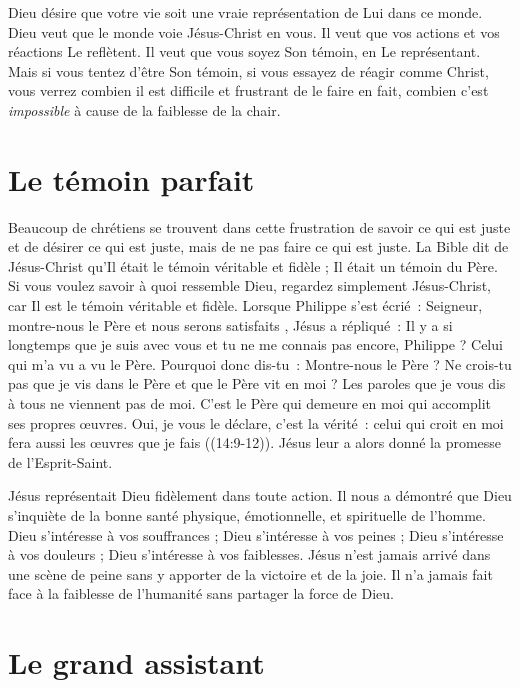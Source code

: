 Dieu désire que votre vie soit une vraie représentation de Lui dans ce monde.
 Dieu veut que le monde voie Jésus-Christ en vous.
 Il veut que vos actions et vos réactions Le reflètent.
 Il veut que vous soyez Son témoin, en Le représentant.
 Mais si vous tentez d'être Son témoin, si vous essayez de réagir comme Christ,
 vous verrez combien il est difficile et frustrant de le faire
 \ocadr en fait, combien c'est \emph{impossible}
 à cause de la faiblesse de la chair.

\section{Le t\'emoin parfait}

Beaucoup de chrétiens se trouvent dans cette frustration de savoir
 ce qui est juste et de désirer ce qui est juste, mais de ne pas faire
 ce qui est juste.
 La Bible dit de Jésus-Christ qu'Il était le témoin véritable et fidèle ;
 Il était un témoin du Père.
 Si vous voulez savoir à quoi ressemble Dieu, regardez simplement
 Jésus-Christ, car Il est le témoin véritable et fidèle.
 Lorsque Philippe s'est écrié~:
 \og Seigneur, montre-nous le Père et nous serons satisfaits \fg{},
 Jésus a répliqué~:
 \og Il y a si longtemps que je suis avec vous et tu ne me connais pas encore,
 Philippe ? Celui qui m'a vu a vu le Père. Pourquoi donc dis-tu~:
 \og Montre-nous le Père \fg{} ?
 Ne crois-tu pas que je vis dans le Père et que le Père vit en moi ?
 Les paroles que je vous dis à tous ne viennent pas de moi.
 C'est le Père qui demeure en moi qui accomplit ses propres œuvres.
 Oui, je vous le déclare, c'est la vérité~:
 celui qui croit en moi fera aussi les œuvres que je fais \fg{}
 ((14:9-12)). Jésus leur a alors donné la promesse
 de l'Esprit-Saint.

Jésus représentait Dieu fidèlement dans toute action.
 Il nous a démontré que Dieu s'inquiète de la bonne santé physique,
 émotionnelle, et spirituelle de l'homme.
 Dieu s'intéresse à vos souffrances ; Dieu s'intéresse à vos peines ;
 Dieu s'intéresse à vos douleurs ; Dieu s'intéresse à vos faiblesses.
 Jésus n'est jamais arrivé dans une scène de peine sans y apporter
 de la victoire et de la joie. Il n'a jamais fait face à la faiblesse
 de l'humanité sans partager la force de Dieu.

\section{Le grand assistant}

